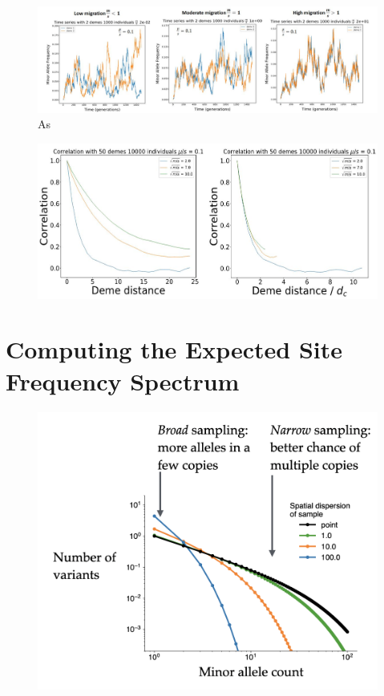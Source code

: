 \begin{figure}[h]
    \centering
    \hspace*{-2cm}
    \includegraphics[scale=0.5]{img/low_high_migration.JPG}
    \caption{As }
    \label{fig:}
\end{figure}

\begin{figure}[h]
    \centering
    \includegraphics[scale=0.3]{img/correlation_curve.JPG}
    \caption{}
    \label{fig:}
\end{figure}




\section{Computing the Expected Site Frequency Spectrum}

\begin{figure}[h]
    \centering
    \includegraphics[scale=0.3]{img/sampling_curves.png}
    \caption{}
    \label{fig:}
\end{figure}


